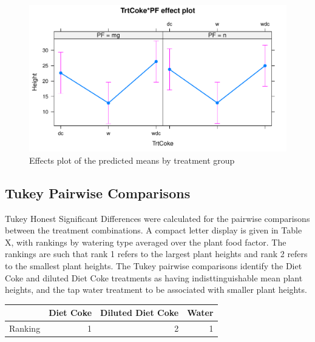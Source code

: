 \documentclass[1p,12pt]{elsarticle}\usepackage[]{graphicx}\usepackage[]{color}
\makeatletter
\def\maxwidth{ %
  \ifdim\Gin@nat@width>\linewidth
    \linewidth
  \else
    \Gin@nat@width
  \fi
}
\newenvironment{knitrout}{}{} %
\makeatother
\begin{document}
\begin{knitrout}
\color{fgcolor}\begin{figure}
\includegraphics[width=\maxwidth]{figure/model_-1} \caption[Effects plot of the predicted means by treatment group]{Effects plot of the predicted means by treatment group}\label{fig:model }
\end{figure}


\end{knitrout}


\subsection{Tukey Pairwise Comparisons}

Tukey Honest Significant Differences were calculated for the pairwise comparisons between the treatment combinations. A compact letter display is given in Table X, with rankings by watering type averaged over the plant food factor. The rankings are such that rank 1 refers to the largest plant heights and rank 2 refers to the smallest plant heights.  The Tukey pairwise comparisons identify the Diet Coke and diluted Diet Coke treatments as having indisttinguishable mean plant heights, and the tap water treatment to be associated with smaller plant heights. 

\begin{table}[ht]
\centering
\begin{tabular}{lrrr}
  \hline
 & Diet Coke & Diluted Diet Coke & Water \\ 
  \hline
Ranking & 1 & 2 & 1 \\ 
  
   \hline
\end{tabular}
\end{table}
\end{document}
